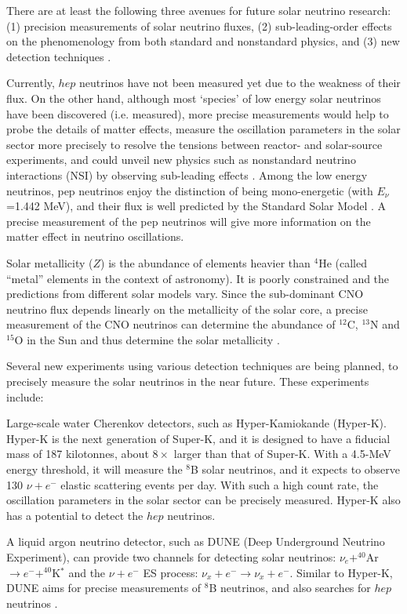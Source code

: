 There are at least the following three avenues for future solar neutrino research: (1) precision measurements of solar neutrino fluxes, (2) sub-leading-order effects on the phenomenology from both standard and nonstandard physics, and (3) new detection techniques \cite{antonio2018state}.

Currently, $hep$ neutrinos have not been measured yet due to the weakness of their flux. On the other hand, although most `species' of low energy solar neutrinos have been discovered (i.e. measured), more precise measurements would help to probe the details of matter effects, measure the oscillation parameters in the solar sector more precisely to resolve the tensions between reactor- and solar-source experiments, and could unveil new physics such as nonstandard neutrino interactions (NSI) by observing sub-leading effects \cite{gann2015everything}. Among the low energy neutrinos, pep neutrinos enjoy the distinction of being mono-energetic (with $E_\nu$=1.442 MeV), and their flux is well predicted by the Standard Solar Model \cite{davini2016cno}. A precise measurement of the pep neutrinos will give more information on the matter effect in neutrino oscillations. 

Solar metallicity ($Z$) is the abundance of elements heavier than $^4$He (called ``metal'' elements in the context of astronomy). It is poorly constrained and the predictions from different solar models vary. Since the sub-dominant CNO neutrino flux depends linearly on the metallicity of the solar core, a precise measurement of the CNO neutrinos can determine the abundance of $^{12}$C, $^{13}$N and $^{15}$O in the Sun and thus determine the solar metallicity \cite{cerdeno2018cno}.

Several new experiments using various detection techniques are being planned, to precisely measure the solar neutrinos in the near future. These experiments include:

Large-scale water Cherenkov detectors, such as Hyper-Kamiokande (Hyper-K). Hyper-K is the next generation of Super-K, and it is designed to have a fiducial mass of 187 kilotonnes, about $8 \times$ larger than that of Super-K. With a 4.5-MeV energy threshold, it will measure the $^8$B solar neutrinos, and it expects to observe 130 $\nu+e^-$ elastic scattering events per day. With such a high count rate, the oscillation parameters in the solar sector can be precisely measured. Hyper-K also has a potential to detect the $hep$ neutrinos\cite{yano2019solar}. 

A liquid argon neutrino detector, such as DUNE (Deep Underground Neutrino Experiment), can provide two channels for detecting solar neutrinos: $\nu_e+^{40}$Ar$\to e^-+^{40}$K$^*$ and the $\nu+e^-$ ES process: $\nu_x+e^-\to\nu_x+e^-$. Similar to Hyper-K, DUNE aims for precise measurements of $^8$B neutrinos, and also searches for $hep$ neutrinos \cite{capozzi2019dune}.

